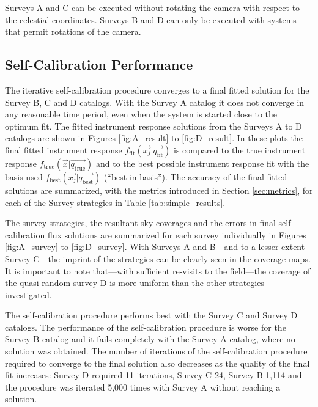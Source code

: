 \documentclass[preprint,pdftex]{aastex}
\newcommand{\true}{\text{true}}
\newcommand{\fit}{\text{fit}}
\newcommand{\basis}{\text{best}}
\begin{document}
Surveys A and C can be executed without rotating the camera with respect to the celestial coordinates. Surveys B and D can only be executed with systems that permit rotations of the camera.

\subsection{Self-Calibration Performance}
The iterative self-calibration procedure converges to a final fitted solution for the Survey B, C and D catalogs. With the Survey A catalog it does not converge in any reasonable time period, even when the system is started close to the optimum fit. The fitted instrument response solutions from the Surveys A to D catalogs are shown in Figures \ref{fig:A_result} to \ref{fig:D_result}. In these plots the final fitted instrument response $f_\fit(\vec{x_j} | \vec{q_\fit})$ is compared to the true instrument response $f_\true(\vec{x} | \vec{q_\true})$ and to the best possible instrument response fit with the basis used $f_\basis(\vec{x_j} | \vec{q_\basis})$ (``best-in-basis''). The accuracy of the final fitted solutions are summarized, with the metrics introduced in Section \ref{sec:metrics}, for each of the Survey strategies in Table \ref{tab:simple_results}. 

The survey strategies, the resultant sky coverages and the errors in final self-calibration flux solutions are summarized for each survey individually in Figures \ref{fig:A_survey} to \ref{fig:D_survey}. With Surveys A and B---and to a lesser extent Survey C---the imprint of the strategies can be clearly seen in the coverage maps. It is important to note that---with sufficient re-visits to the field---the coverage of the quasi-random survey D is more uniform than the other strategies investigated.

The self-calibration procedure performs best with the Survey C and Survey D catalogs. The performance of the self-calibration procedure is worse for the Survey B catalog and it fails completely with the Survey A catalog, where no solution was obtained. The number of iterations of the self-calibration procedure required to converge to the final solution also decreases as the quality of the final fit increases: Survey D required 11 iterations, Survey C 24, Survey B 1,114 and the procedure was iterated 5,000 times with Survey A without reaching a solution.
\end{document}
